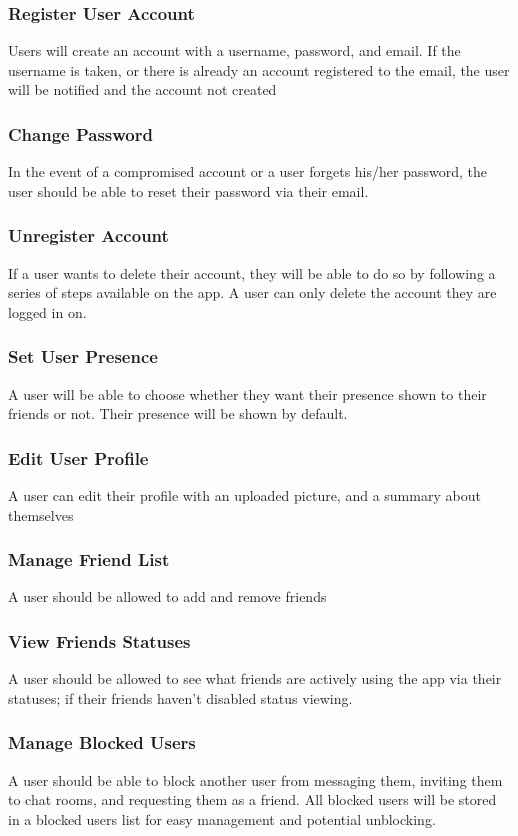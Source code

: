 \documentclass[11pt]{article}
\theoremstyle{plain}
\theoremstyle{definition}
\begin{document}
\subsubsection{Register User Account}
Users will create an account with a username, password, and email. If the username is taken, or there is already an account registered to the email, the user will be notified and the account not created
\subsubsection{Change Password}
In the event of a compromised account or a user forgets his/her password, the user should be able to reset their password via their email.
\subsubsection{Unregister Account}
If a user wants to delete their account, they will be able to do so by following a series of steps available on the app. A user can only delete the account they are logged in on.
\subsubsection{Set User Presence}
A user will be able to choose whether they want their presence shown to their friends or not. Their presence will be shown by default.
\subsubsection{Edit User Profile}
A user can edit their profile with an uploaded picture, and a summary about themselves
\subsubsection{Manage Friend List}
A user should be allowed to add and remove friends
\subsubsection{View Friends Statuses}
A user should be allowed to see what friends are actively using the app via their statuses; if their friends haven't disabled status viewing. 
\subsubsection{Manage Blocked Users}
A user should be able to block another user from messaging them, inviting them to chat rooms, and requesting them as a friend. All blocked users will be stored in a blocked users list for easy management and potential unblocking. 
\end{document}
